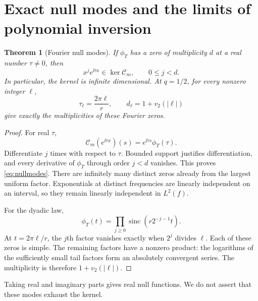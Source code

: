 \documentclass[11pt,a4paper]{article}
\numberwithin{equation}{section}
\newtheorem{theorem}{Theorem}[section]
\theoremstyle{definition}\newtheorem{definition}[theorem]{Definition}
\theoremstyle{remark}\newtheorem{remark}[theorem]{Remark}
\newcommand{\sinc}{\operatorname{sinc}}\newcommand{\HS}{\mathrm{HS}}
\newcommand{\calC}{\mathcal C_m}\newcommand{\calP}{\mathcal P}
\begin{document}
\section{Exact null modes and the limits of polynomial inversion}
\label{sec:null}
\begin{theorem}[Fourier null modes]
\label{thm:null}
If $\phi_T$ has a zero of multiplicity $d$ at a real number $\tau\ne0$, then
\begin{equation}
 x^j e^{\ii\tau x}\in\ker\calC,\qquad 0\le j<d.
 \label{eq:nullmodes}
\end{equation}
In particular, the kernel is infinite dimensional. At $q=1/2$, for every nonzero integer $\ell$,
\begin{equation}
 \tau_\ell=\frac{2\pi\ell}{r},\qquad
 d_\ell=1+v_2(|\ell|)
 \label{eq:dyadic-null}
\end{equation}
give exactly the multiplicities of these Fourier zeros.
\end{theorem}
\begin{proof}
For real $\tau$,
\[
 \calC(e^{\ii\tau x})(s)=e^{\ii\tau s}\phi_T(\tau).
\]
Differentiate $j$ times with respect to $\tau$. Bounded support justifies differentiation, and every derivative of $\phi_T$ through order $j<d$ vanishes. This proves \eqref{eq:nullmodes}. There are infinitely many distinct zeros already from the largest uniform factor. Exponentials at distinct frequencies are linearly independent on an interval, so they remain linearly independent in $L^2(f)$.

For the dyadic law,
\[
 \phi_T(t)=\prod_{j\ge0}\sinc(r2^{-j-1}t).
\]
At $t=2\pi\ell/r$, the $j$th factor vanishes exactly when $2^j$ divides $\ell$. Each of these zeros is simple. The remaining factors have a nonzero product: the logarithms of the sufficiently small tail factors form an absolutely convergent series. The multiplicity is therefore $1+v_2(|\ell|)$.
\end{proof}
Taking real and imaginary parts gives real null functions. We do not assert that these modes exhaust the kernel.
\end{document}
